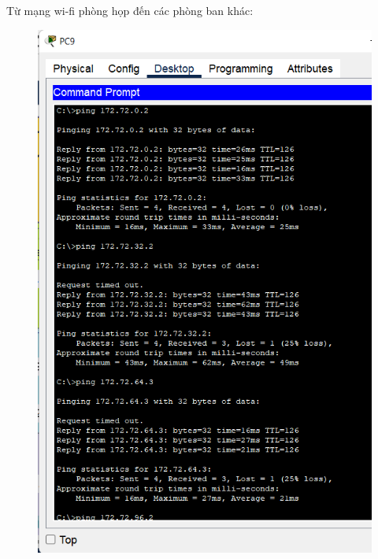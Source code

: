 \begin{enumerate}
\begin{enumerate}
Từ mạng wi-fi phòng họp đến các phòng ban khác:
\begin{figure}[H]
\begin{center}
\includegraphics[scale=.5]{../figures/p2/test-ping-9}

\end{center}
\end{figure}
\end{enumerate}
\end{enumerate}
